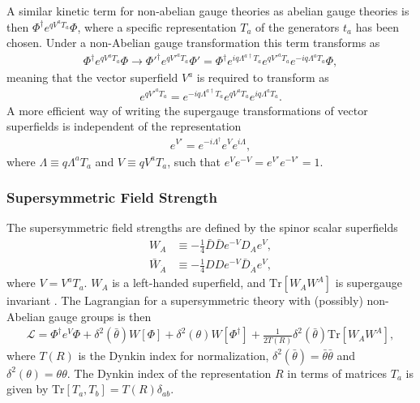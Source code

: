 \documentclass[twoside,english]{uiofysmaster}
\begin{document}
A similar kinetic term for non-abelian gauge theories as abelian gauge theories is then $\Phi^{\dagger} e^{qV^aT_a} \Phi$, where a specific representation $T_a$ of the generators $t_a$ has been chosen. Under a non-Abelian gauge transformation this term transforms as
\begin{align}
\Phi^{\dagger} e^{qV^aT_a} \Phi \rightarrow {\Phi'}^{\dagger} e^{q{V'}^aT_a} \Phi' = \Phi^{\dagger} e^{iq\Lambda^{a \dagger} T_a} e^{q{V'}^aT_a} e^{-iq \Lambda^a T_a} \Phi,
\end{align}
meaning that the vector superfield $V^a$ is required to transform as
\begin{align}
e^{q{V'}^a T_a} = e^{-iq \Lambda^{a \dagger} T_a} e^{qV^aT_a} e^{iq\Lambda^a T_a}.
\end{align}
A more efficient way of writing the supergauge transformations of vector superfields is independent of the representation
\begin{align}
e^{V'} = e^{-i \Lambda^{\dagger}}e^{V} e^{i \Lambda},
\end{align} 
where $\Lambda \equiv q \Lambda^aT_a $ and $V \equiv qV^a T_a$, such that $e^{V}e^{-V}= e^{V'}e^{-V'}=1$.

\subsubsection{Supersymmetric Field Strength}

The supersymmetric field strengths are defined by the spinor scalar superfields
\begin{align}
W_A & \equiv - \frac{1}{4} \bar{D} \bar{D} e^{-V} D_A e^V,\\
\bar{W}_{\dot{A}} & \equiv - \frac{1}{4} DDe^{-V}\bar{D}_{\dot{A}} e^V,
\end{align}
where $V = V^a T_a$. $W_A$ is a left-handed superfield, and $\text{Tr}[W_AW^A]$ is supergauge invariant \cite{batzing2017lecture}. The Lagrangian for a supersymmetric theory with (possibly) non-Abelian gauge groups is then
\begin{align}
\mathcal{L} = \Phi^{\dagger} e^{V} \Phi + \delta^2 (\bar{\theta}) W[\Phi] + \delta^2 (\theta) W[\Phi^{\dagger}] + \frac{1}{2T(R)} \delta^2 (\bar{\theta}) \text{Tr}[W_AW^A],
\end{align}
where $T(R)$ is the Dynkin index for normalization, $\delta^2(\bar{\theta}) = \bar{\theta} \bar{\theta}$ and $\delta^2(\theta) = \theta \theta$. The Dynkin index of the representation $R$ in terms of matrices $T_a$ is given by $\text{Tr}[T_a, T_b] = T(R) \delta_{ab}$.
\end{document}
